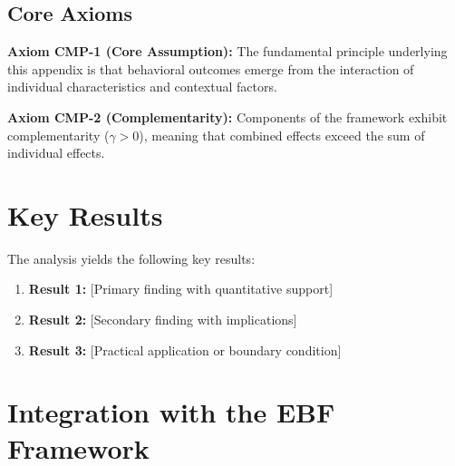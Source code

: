 
\subsection{Core Axioms}
\label{sec:cmp-axioms}

\begin{tcolorbox}[colback=yellow!5!white,colframe=yellow!75!black,title=Axiom CMP-1: Fundamental Principle]
\textbf{Axiom CMP-1 (Core Assumption):}
The fundamental principle underlying this appendix is that behavioral outcomes
emerge from the interaction of individual characteristics and contextual factors.
\end{tcolorbox}

\begin{tcolorbox}[colback=yellow!5!white,colframe=yellow!75!black,title=Axiom CMP-2: Complementarity]
\textbf{Axiom CMP-2 (Complementarity):}
Components of the framework exhibit complementarity ($\gamma > 0$), meaning
that combined effects exceed the sum of individual effects.
\end{tcolorbox}



\section{Key Results}
\label{sec:cmp-results}

The analysis yields the following key results:

\begin{enumerate}
    \item \textbf{Result 1:} [Primary finding with quantitative support]
    \item \textbf{Result 2:} [Secondary finding with implications]
    \item \textbf{Result 3:} [Practical application or boundary condition]
\end{enumerate}


\section{Integration with the EBF Framework}
\label{sec:ebf-integration}

